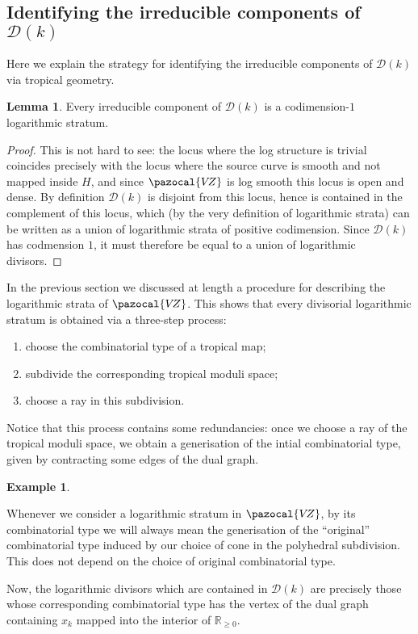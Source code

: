 \documentclass[11pt]{amsart}
\newcommand{\VZ}{\pazocal{V\!Z}}
\newcommand{\Dcal}{\mathcal{D}}
\newcommand{\RR}{\mathbb{R}}
\theoremstyle{definition}
\newtheorem{lemma}[thm]{Lemma}
\theoremstyle{definition}
\newtheorem{example}[thm]{Example}
\begin{document}
\subsection{Identifying the irreducible components of $\Dcal(k)$} Here we explain the strategy for identifying the irreducible components of $\Dcal(k)$ via tropical geometry.

\begin{lemma} Every irreducible component of $\Dcal(k)$ is a codimension-$1$ logarithmic stratum.\end{lemma}
\begin{proof} This is not hard to see: the locus where the log structure is trivial coincides precisely with the  locus where the source curve is smooth and not mapped inside $H$, and since $\VZ$ is log smooth this locus is open and dense. By definition $\Dcal(k)$ is disjoint from this locus, hence is contained in the  complement of this locus, which (by the very definition of logarithmic strata) can be written as a union of logarithmic strata of positive codimension. Since $\Dcal(k)$ has codmension $1$, it must therefore be equal to a union of logarithmic divisors.\end{proof}

In the previous section we discussed at length a procedure for describing the logarithmic strata of $\VZ$. This shows that every divisorial logarithmic stratum is obtained via a three-step process:
\begin{enumerate}
\item choose the combinatorial type of a tropical map;
\item subdivide the corresponding tropical moduli space;
\item choose a ray in this subdivision.
\end{enumerate}
Notice that this process contains some redundancies: once we choose a ray of the tropical moduli space, we obtain a generisation of the intial combinatorial type, given by contracting some edges of the dual graph.

\begin{example} \end{example}

Whenever we consider a logarithmic stratum in $\VZ$, by its combinatorial type we will always mean the generisation of the ``original'' combinatorial type induced by our choice of cone in the polyhedral subdivision. This does not depend on the choice of original combinatorial type.

Now, the logarithmic divisors which are contained in $\Dcal(k)$ are precisely those whose corresponding combinatorial type has the vertex of the dual graph containing $x_k$ mapped into the interior of $\RR_{\geq 0}$.
\end{document}
